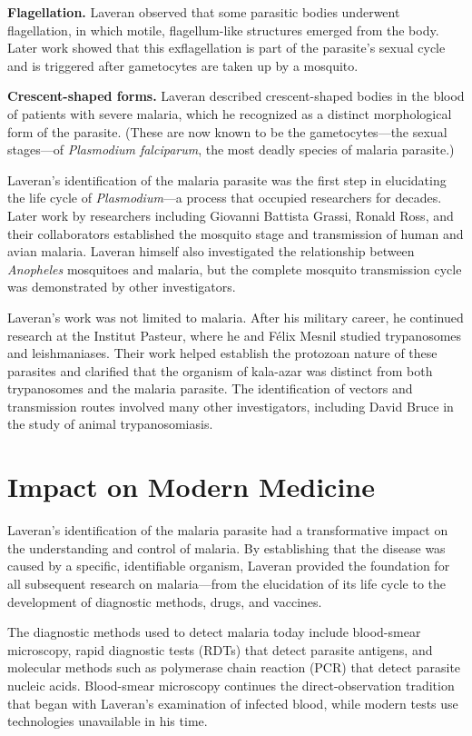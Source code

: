 \textbf{Flagellation.} Laveran observed that some parasitic bodies underwent flagellation, in which motile, flagellum-like structures emerged from the body. Later work showed that this exflagellation is part of the parasite's sexual cycle and is triggered after gametocytes are taken up by a mosquito.

\textbf{Crescent-shaped forms.} Laveran described crescent-shaped bodies in the blood of patients with severe malaria, which he recognized as a distinct morphological form of the parasite. (These are now known to be the gametocytes---the sexual stages---of \emph{Plasmodium falciparum}, the most deadly species of malaria parasite.)

Laveran's identification of the malaria parasite was the first step in elucidating the life cycle of \emph{Plasmodium}---a process that occupied researchers for decades. Later work by researchers including Giovanni Battista Grassi, Ronald Ross, and their collaborators established the mosquito stage and transmission of human and avian malaria. Laveran himself also investigated the relationship between \emph{Anopheles} mosquitoes and malaria, but the complete mosquito transmission cycle was demonstrated by other investigators.\cite{laveran-history}

Laveran's work was not limited to malaria. After his military career, he continued research at the Institut Pasteur, where he and Félix Mesnil studied trypanosomes and leishmaniases. Their work helped establish the protozoan nature of these parasites and clarified that the organism of kala-azar was distinct from both trypanosomes and the malaria parasite. The identification of vectors and transmission routes involved many other investigators, including David Bruce in the study of animal trypanosomiasis.\cite{laveran-history}

\section{Impact on Modern Medicine}

Laveran's identification of the malaria parasite had a transformative impact on the understanding and control of malaria. By establishing that the disease was caused by a specific, identifiable organism, Laveran provided the foundation for all subsequent research on malaria---from the elucidation of its life cycle to the development of diagnostic methods, drugs, and vaccines.

The diagnostic methods used to detect malaria today include blood-smear microscopy, rapid diagnostic tests (RDTs) that detect parasite antigens, and molecular methods such as polymerase chain reaction (PCR) that detect parasite nucleic acids. Blood-smear microscopy continues the direct-observation tradition that began with Laveran's examination of infected blood, while modern tests use technologies unavailable in his time.

